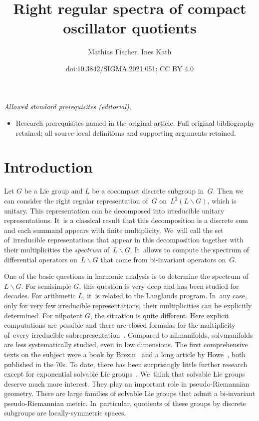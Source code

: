 \documentclass[10pt,a4paper]{amsart}
\title{Right regular spectra of compact oscillator quotients}
\author{Mathias Fischer, Ines Kath}
\date{doi:10.3842/SIGMA.2021.051; CC BY 4.0}
\numberwithin{equation}{section}
\begin{document}
\maketitle
\noindent\textit{Allowed standard prerequisites (editorial).}\begin{itemize}
\item Research prerequisites named in the original article. Full original bibliography retained; all source-local definitions and supporting arguments retained.
\end{itemize}\medskip
\section{Introduction}
Let $G$ be a Lie group and $L$ be a cocompact discrete subgroup in~$G$. Then we can consider the right regular representation of~$G$ on~$L^2(L\backslash G)$, which is unitary. This representation can be decomposed into irreducible unitary representations. It~is a classical result that this decomposition is a discrete sum and each summand appears with finite multiplicity. We~will call the set of~irreducible representations that appear in this decomposition together with their multiplicities the {\it spectrum} of~$L\backslash G$. It~allows to compute the spectrum of differential operators on~$L\backslash G$ that come from bi-invariant operators on~$G$.

One of the basic questions in harmonic analysis is to determine the spectrum of~$L\backslash G$. For semisimple $G$, this question is very deep and has been studied for decades. For arithmetic $L$, it~is related to the Langlands program. In~any case, only for very few irreducible representations, their multiplicities can be explicitly determined. For nilpotent $G$, the situation is quite different. Here explicit computations are possible and there are closed formulas for the multiplicity of~every irreducible subrepresentation~\cite{CG, H71, R71}. Compared to nilmanifolds, solvmanifolds are less systematically studied, even in low dimensions. The first comprehensive texts on the subject were a book by Brezin~\cite{Br} and a long article by Howe~\cite{Ho77}, both published in the 70s. To date, there has been surprisingly little further research except for exponential solvable Lie groups~\cite{FL}. We~think that solvable Lie groups deserve much more interest. They play an important role in pseudo-Riemannian geometry. There are large families of solvable Lie groups that admit a bi-invariant pseudo-Riemannian metric. In~particular, quotients of these groups by discrete subgroups are locally-symmetric spaces.
\end{document}
